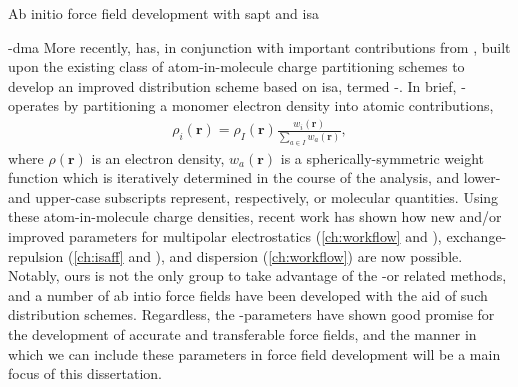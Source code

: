 \begin{section}{Ab initio force field development with \acrshort{sapt} and
\acrshort{isa}}
\begin{subsection}{\isa-\acrshort{dma}}
More recently, \citet{Misquitta2014} has, in conjunction with important
contributions from
\citeauthor{Lillestolen2008},\cite{Lillestolen2008,Lillestolen2009} 
built upon the existing class of \citet{Hirshfeld1977} atom-in-molecule
charge partitioning schemes to develop an improved distribution scheme based on
\acrfull{isa}, 
termed \isa-\dma. 
In brief, \isa-\dma operates by partitioning a monomer
electron density into atomic contributions,
\begin{align}
\label{eq:intro-isa}
\rho_i(\mathbf{r}) = \rho_I(\mathbf{r})
\frac{ w_i(\mathbf{r}) }{ \sum \limits_{a \in I} w_a(\mathbf{r}) }, 
\end{align}
where $\rho(\mathbf{r})$ is an electron density, $w_a(\mathbf{r})$ is a
spherically-symmetric weight function which is iteratively determined in the
course of the \isa analysis, and lower- and upper-case subscripts
represent, respectively, \aim or molecular quantities.
\cite{Misquitta2014}
Using these atom-in-molecule charge densities, recent work has shown how
new and/or improved parameters for multipolar electrostatics 
(\cref{ch:workflow} and ),
exchange-repulsion (\cref{ch:isaff} and ),
and dispersion (\cref{ch:workflow})
are now possible.
Notably, ours is not the only group to take advantage of the \isa-\dma or related
methods,
\cite{Verstraelen2016}
and a number of ab intio force fields have been developed with the aid of such
distribution schemes.
\cite{Vandenbrande2016,Verstraelen2014,Misquitta2016,Metz2016}
Regardless, the \isa-\dma parameters have shown good promise for the
development of accurate and transferable force fields, and the manner in which
we can include these parameters in force field development will be a main
focus of this dissertation.

\end{subsection}


\end{section}
